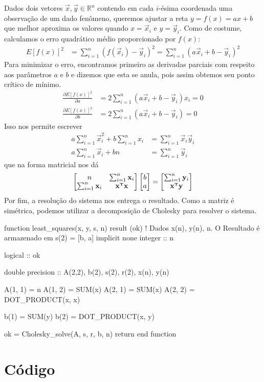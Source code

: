 \documentclass{homework}
\begin{document}
	\quest
	
	Dados dois vetores $\vec{x}, \vec{y} \in \mathbb{R}^n$ contendo em cada $i$-ésima coordenada uma observação de um dado fenômeno, queremos ajustar a reta $y = f(x) = a x + b$ que melhor aproxima os valores quando $x = \vec{x}_i$ e $y = \vec{y}_i$. Como de costume, calculamos o erro quadrático médio proporcionado por $f(x)$:
		\begin{align*}
			E[f(x)]^2 &= \sum_{i=1}^{n} (f(\vec{x}_i) - \vec{y}_i)^2 = \sum_{i=1}^{n} (a \vec{x}_i + b  - \vec{y}_i)^2
		\end{align*}
	Para minimizar o erro, encontramos primeiro as derivadas parciais com respeito aos parâmetros $a$ e $b$ e dizemos que esta se anula, pois assim obtemos seu ponto crítico de mínimo.
		\begin{align*}
			\frac{\partial E[f(x)]^2}{\partial a} &= 2 \sum_{i=1}^{n} (a \vec{x}_i + b  - \vec{y}_i) x_i = 0\\
			\frac{\partial E[f(x)]^2}{\partial b} &= 2 \sum_{i=1}^{n} (a \vec{x}_i + b  - \vec{y}_i) = 0
		\end{align*}
	Isso nos permite escrever
		\begin{align*}
			a \sum_{i=1}^{n} \vec{x}_i^2 + b \sum_{i=1}^{n} x_i &= \sum_{i=1}^{n} \vec{x}_i \vec{y}_i\\
			a \sum_{i=1}^{n} \vec{x}_i + b n  &= \sum_{i=1}^{n} \vec{y}_i
		\end{align*}
	que na forma matricial nos dá
		$$ \left[\begin{array}{@{}cc@{}} %
		n & \sum_{i=1}^{n} \vec{x}_i \\
		\sum_{i=1}^{n} \vec{x}_i & \vec{x}^\T\vec{x} \\
		\end{array}\right]%
		\left[\begin{array}{@{}c@{}} %
		b\\
		a
		\end{array}\right]
		=		
		\left[\begin{array}{@{}c@{}} %
		\sum_{i=1}^{n} \vec{y}_i\\
		\vec{x}^\T\vec{y}
		\end{array}\right]
		$$
	Por fim, a resolução do sistema nos entrega o resultado. Como a matriz é simétrica, podemos utilizar a decomposição de Cholesky para resolver o sistema. 
	
	\begin{fortran}
	function least_squares(x, y, s, n) result (ok)
	!	Dados x(n), y(n), n. O Resultado é armazenado em s(2) = [b, a]
		implicit none
		integer :: n
		
		logical :: ok
		
		double precision :: A(2,2), b(2), s(2), r(2), x(n), y(n)
		
		A(1, 1) = n
		A(1, 2) = SUM(x)
		A(2, 1) = SUM(x)
		A(2, 2) = DOT_PRODUCT(x, x)
		
		b(1) = SUM(y)
		b(2) = DOT_PRODUCT(x, y)
		
		ok = Cholesky_solve(A, s, r, b, n)
		return
	end function
	\end{fortran}

	\pagebreak
	\appendixpage
	\appendix \section*{Código}
	
%		
\end{document}
